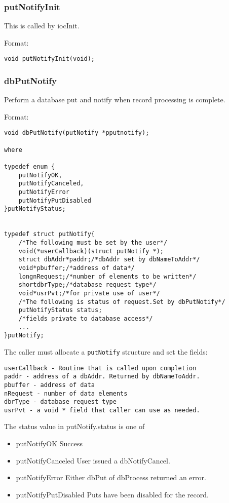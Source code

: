 \subsubsection{putNotifyInit}

This is called by iocInit.

Format:

\begin{verbatim}
void putNotifyInit(void);
\end{verbatim}

\subsubsection{dbPutNotify}

Perform a database put and notify when record processing is complete.

Format:

\begin{verbatim}
void dbPutNotify(putNotify *pputnotify);

where

typedef enum {
    putNotifyOK,
    putNotifyCanceled,
    putNotifyError
    putNotifyPutDisabled
}putNotifyStatus;


typedef struct putNotify{
    /*The following must be set by the user*/
    void(*userCallback)(struct putNotify *);
    struct dbAddr*paddr;/*dbAddr set by dbNameToAddr*/
    void*pbuffer;/*address of data*/
    longnRequest;/*number of elements to be written*/
    shortdbrType;/*database request type*/
    void*usrPvt;/*for private use of user*/
    /*The following is status of request.Set by dbPutNotify*/
    putNotifyStatus status;
    /*fields private to database access*/
    ...
}putNotify;
\end{verbatim}

The caller must allocate a \verb|putNotify| structure and set the fields:

\begin{verbatim}
userCallback - Routine that is called upon completion
paddr - address of a dbAddr. Returned by dbNameToAddr.
pbuffer - address of data
nRequest - number of data elements
dbrType - database request type
usrPvt - a void * field that caller can use as needed.
\end{verbatim}

The status value in putNotify.status is one of

\begin{itemize}
\item  {}putNotifyOK Success

\item {}putNotifyCanceled User issued a dbNotifyCancel.

\item putNotifyError Either dbPut of dbProcess returned an error.

\item putNotifyPutDisabled Puts have been disabled for the record.

\end{itemize}

